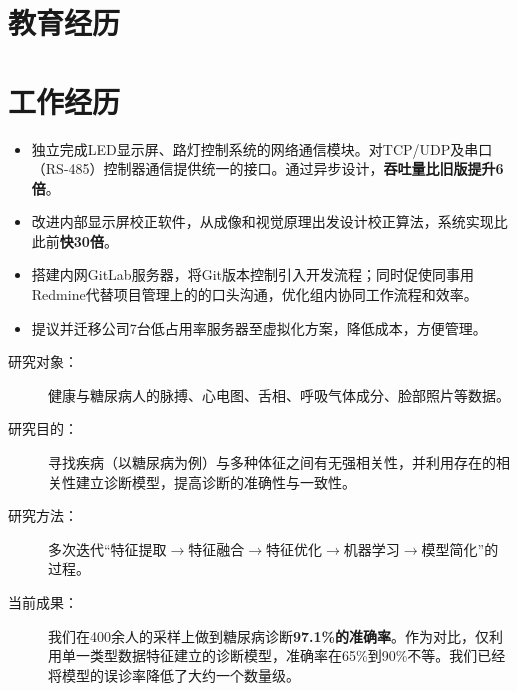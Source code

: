\documentclass[11pt,a4paper]{moderncv/moderncv}
\begin{document}
\maketitle


\section{教育经历}


\section{工作经历}
{
\begin{itemize}
	\item 独立完成LED显示屏、路灯控制系统的网络通信模块。对TCP/UDP及串口（RS-485）控制器通信提供统一的接口。通过异步设计，\textbf{吞吐量比旧版提升6倍}。
	\item 改进内部显示屏校正软件，从成像和视觉原理出发设计校正算法，系统实现比此前\textbf{快30倍}。
	\item 搭建内网GitLab服务器，将Git版本控制引入开发流程；同时促使同事用Redmine代替项目管理上的的口头沟通，优化组内协同工作流程和效率。
	\item 提议并迁移公司7台低占用率服务器至虚拟化方案，降低成本，方便管理。
\end{itemize}
}

{
\begin{description}
	\item[研究对象：] 健康与糖尿病人的脉搏、心电图、舌相、呼吸气体成分、脸部照片等数据。
	\item[研究目的：] 寻找疾病（以糖尿病为例）与多种体征之间有无强相关性，并利用存在的相关性建立诊断模型，提高诊断的准确性与一致性。
	\item[研究方法：] 多次迭代``特征提取$\rightarrow$特征融合$\rightarrow$特征优化$\rightarrow$机器学习$\rightarrow$模型简化''的过程。
	\item[当前成果：] 我们在400余人的采样上做到糖尿病诊断\textbf{97.1\%的准确率}。作为对比，仅利用单一类型数据特征建立的诊断模型，准确率在65\%到90\%不等。我们已经将模型的误诊率降低了大约一个数量级。
\end{description}
}
\end{document}

